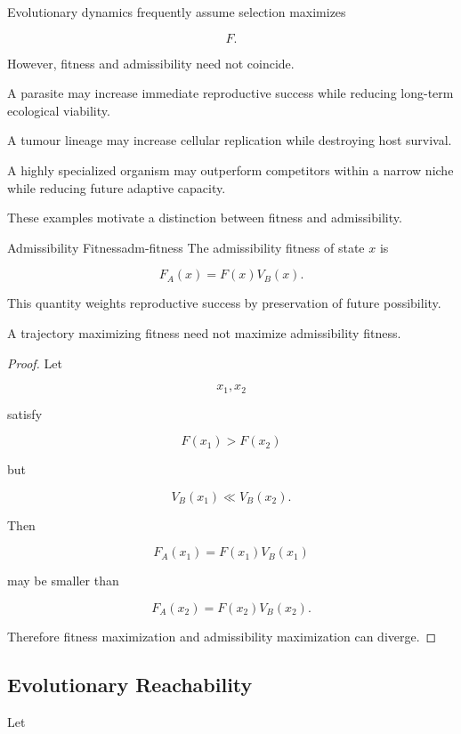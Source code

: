 \documentclass[12pt,twoside,openright]{book}
\newenvironment{prop}
{\begin{proposition}{}{}}
{\end{proposition}}
\newenvironment{ex}
{\begin{example}{}{}}
{\end{example}}
\begin{document}
Evolutionary dynamics frequently assume selection
maximizes

\[
F.
\]

However, fitness and admissibility need not coincide.

\begin{ex}
A parasite may increase immediate reproductive success
while reducing long-term ecological viability.

A tumour lineage may increase cellular replication while
destroying host survival.

A highly specialized organism may outperform competitors
within a narrow niche while reducing future adaptive
capacity.
\end{ex}

These examples motivate a distinction between fitness and
admissibility.

\begin{definition}{Admissibility Fitness}{adm-fitness}
The admissibility fitness of state \(x\) is

\[
F_A(x)
=
F(x)V_B(x).
\]
\end{definition}

This quantity weights reproductive success by preservation
of future possibility.

\begin{prop}
A trajectory maximizing fitness need not maximize
admissibility fitness.
\end{prop}

\begin{proof}
Let

\[
x_1,x_2
\]

satisfy

\[
F(x_1)>F(x_2)
\]

but

\[
V_B(x_1)\ll V_B(x_2).
\]

Then

\[
F_A(x_1)
=
F(x_1)V_B(x_1)
\]

may be smaller than

\[
F_A(x_2)
=
F(x_2)V_B(x_2).
\]

Therefore fitness maximization and admissibility
maximization can diverge.
\end{proof}

\subsection{Evolutionary Reachability}

Let
\end{document}
